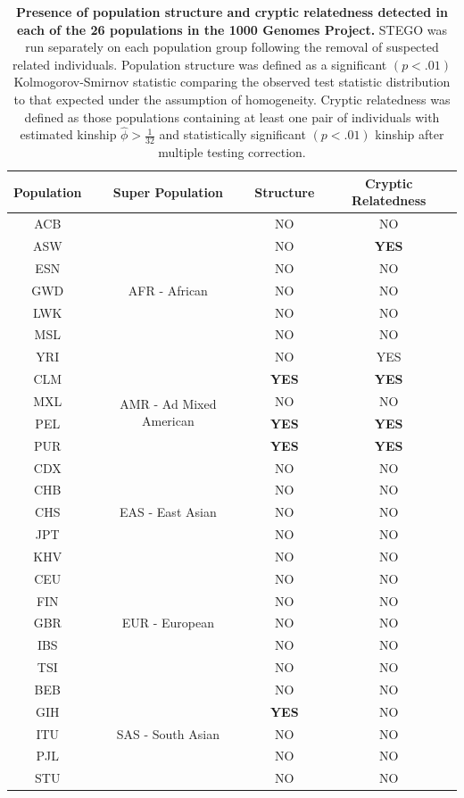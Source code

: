 \begin{table}
\begin{tabular}{|c|c|c|c|}
\hline 
Population & Super Population & Structure & Cryptic Relatedness\tabularnewline
\hline 
\hline 
ACB & \multirow{7}{*}{AFR - African} & NO & NO\tabularnewline
\cline{1-1} \cline{3-4} 
ASW &  & NO & \textbf{YES}\tabularnewline
\cline{1-1} \cline{3-4} 
ESN &  & NO & NO\tabularnewline
\cline{1-1} \cline{3-4} 
GWD &  & NO & NO\tabularnewline
\cline{1-1} \cline{3-4} 
LWK &  & NO & NO\tabularnewline
\cline{1-1} \cline{3-4} 
MSL &  & NO & NO\tabularnewline
\cline{1-1} \cline{3-4} 
YRI &  & NO & YES\tabularnewline
\hline 
CLM & \multirow{4}{*}{AMR - Ad Mixed American} & \textbf{YES} & \textbf{YES}\tabularnewline
\cline{1-1} \cline{3-4} 
MXL &  & NO & NO\tabularnewline
\cline{1-1} \cline{3-4} 
PEL &  & \textbf{YES} & \textbf{YES}\tabularnewline
\cline{1-1} \cline{3-4} 
PUR &  & \textbf{YES} & \textbf{YES}\tabularnewline
\hline 
CDX & \multirow{5}{*}{EAS - East Asian} & NO & NO\tabularnewline
\cline{1-1} \cline{3-4} 
CHB &  & NO & NO\tabularnewline
\cline{1-1} \cline{3-4} 
CHS &  & NO & NO\tabularnewline
\cline{1-1} \cline{3-4} 
JPT &  & NO & NO\tabularnewline
\cline{1-1} \cline{3-4} 
KHV &  & NO & NO\tabularnewline
\hline 
CEU & \multirow{5}{*}{EUR - European} & NO & NO\tabularnewline
\cline{1-1} \cline{3-4} 
FIN &  & NO & NO\tabularnewline
\cline{1-1} \cline{3-4} 
GBR &  & NO & NO\tabularnewline
\cline{1-1} \cline{3-4} 
IBS &  & NO & NO\tabularnewline
\cline{1-1} \cline{3-4} 
TSI &  & NO & NO\tabularnewline
\hline 
BEB & \multirow{5}{*}{SAS - South Asian} & NO & NO\tabularnewline
\cline{1-1} \cline{3-4} 
GIH &  & \textbf{YES} & NO\tabularnewline
\cline{1-1} \cline{3-4} 
ITU &  & NO & NO\tabularnewline
\cline{1-1} \cline{3-4} 
PJL &  & NO & NO\tabularnewline
\cline{1-1} \cline{3-4} 
STU &  & NO & NO\tabularnewline
\hline 
\end{tabular}\caption[Presence of population structure and cryptic relatedness detected
in each of the 26 populations in the 1000 Genomes Project]{\textbf{Presence of population structure and cryptic relatedness detected
in each of the 26 populations in the 1000 Genomes Project.} STEGO
was run separately on each population group following the removal
of suspected related individuals. Population structure was defined
as a significant $\left(p<.01\right)$ Kolmogorov-Smirnov statistic
comparing the observed test statistic distribution to that expected
under the assumption of homogeneity. Cryptic relatedness was defined
as those populations containing at least one pair of individuals with
estimated kinship $\hat{\phi}>\frac{1}{32}$ and statistically significant
$\left(p<.01\right)$ kinship after multiple testing correction. }

\label{population_table}
\end{table}
